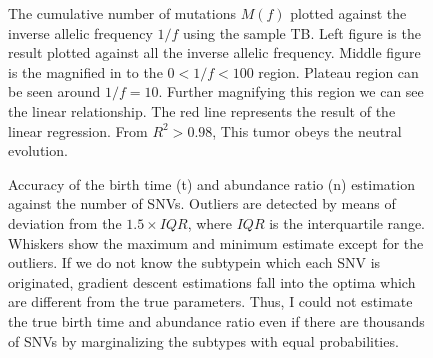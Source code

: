 \documentclass{article}
\begin{document}
\begin{figure}[H]
\begin{center}
 \caption{The cumulative number of mutations $M(f)$ plotted against the inverse allelic frequency $1/f$ using the sample TB.
 Left figure is the result plotted against all the inverse allelic frequency. Middle figure is the magnified in to the $0 < 1/f < 100$ region. Plateau region can be seen around $1/f = 10$. Further magnifying this region we can see the linear relationship. The red line represents the result of the linear regression. From $R^2 > 0.98$, This tumor obeys the neutral evolution.}
\end{center}
\end{figure}


\begin{figure}[H]
   \caption{
 Accuracy of the birth time (t) and abundance ratio (n) estimation against the number of SNVs. Outliers are detected by means of deviation from the $1.5 \times IQR$, where $IQR$ is the interquartile range. Whiskers show the maximum and minimum estimate except for the outliers. If we do not know the subtypein which each SNV is originated, gradient descent estimations fall into the optima which are different from the true parameters. Thus, I could not estimate the true birth time and abundance ratio even if there are thousands of SNVs by marginalizing the subtypes with equal probabilities.
  }
 \label{fig: binom_subtype_ungiven}
\end{figure}
\end{document}
